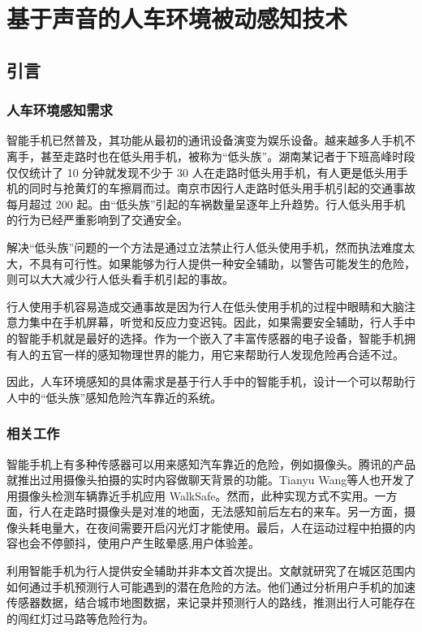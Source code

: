 \chapter{基于声音的人车环境被动感知技术}
\section{引言}
\subsection{人车环境感知需求}
智能手机已然普及，其功能从最初的通讯设备演变为娱乐设备。越来越多人手机不离手，甚至走路时也在低头用手机，被称为“低头族”。湖南某记者于下班高峰时段仅仅统计了 10 分钟就发现不少于 30 人在走路时低头用手机，有人更是低头用手机的同时与抢黄灯的车擦肩而过。南京市因行人走路时低头用手机引起的交通事故每月超过 200 起。由“低头族”引起的车祸数量呈逐年上升趋势。行人低头用手机的行为已经严重影响到了交通安全。


解决“低头族”问题的一个方法是通过立法禁止行人低头使用手机，然而执法难度太大，不具有可行性。如果能够为行人提供一种安全辅助，以警告可能发生的危险，则可以大大减少行人低头看手机引起的事故。

行人使用手机容易造成交通事故是因为行人在低头使用手机的过程中眼睛和大脑注意力集中在手机屏幕，听觉和反应力变迟钝。因此，如果需要安全辅助，行人手中的智能手机就是最好的选择。作为一个嵌入了丰富传感器的电子设备，智能手机拥有人的五官一样的感知物理世界的能力，用它来帮助行人发现危险再合适不过。

因此，人车环境感知的具体需求是基于行人手中的智能手机，设计一个可以帮助行人中的“低头族”感知危险汽车靠近的系统。
\subsection{相关工作}

智能手机上有多种传感器可以用来感知汽车靠近的危险，例如摄像头。腾讯的产品就推出过用摄像头拍摄的实时内容做聊天背景的功能。Tianyu Wang等人也开发了用摄像头检测车辆靠近手机应用 WalkSafe。然而，此种实现方式不实用。一方面，行人在走路时摄像头是对准的地面，无法感知前后左右的来车。另一方面，摄像头耗电量大，在夜间需要开启闪光灯才能使用。最后，人在运动过程中拍摄的内容也会不停颤抖，使用户产生眩晕感,用户体验差。


利用智能手机为行人提供安全辅助并非本文首次提出。文献\cite{datta2014towards}就研究了在城区范围内如何通过手机预测行人可能遇到的潜在危险的方法。他们通过分析用户手机的加速传感器数据，结合城市地图数据，来记录并预测行人的路线，推测出行人可能存在的闯红灯过马路等危险行为。


